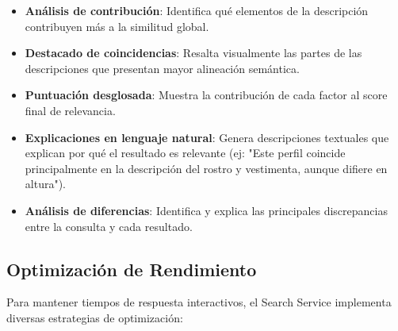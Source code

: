 \documentclass[12pt,a4paper]{article}
\begin{document}
\begin{itemize}
    \item \textbf{Análisis de contribución}: Identifica qué elementos de la descripción contribuyen más a la similitud global.
    
    \item \textbf{Destacado de coincidencias}: Resalta visualmente las partes de las descripciones que presentan mayor alineación semántica.
    
    \item \textbf{Puntuación desglosada}: Muestra la contribución de cada factor al score final de relevancia.
    
    \item \textbf{Explicaciones en lenguaje natural}: Genera descripciones textuales que explican por qué el resultado es relevante (ej: "Este perfil coincide principalmente en la descripción del rostro y vestimenta, aunque difiere en altura").
    
    \item \textbf{Análisis de diferencias}: Identifica y explica las principales discrepancias entre la consulta y cada resultado.
\end{itemize}

\subsection{Optimización de Rendimiento}
\label{subsec:ss-rendimiento}

Para mantener tiempos de respuesta interactivos, el Search Service implementa diversas estrategias de optimización:
\end{document}
